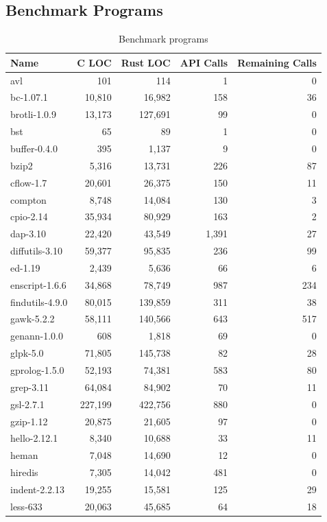 \subsection{Benchmark Programs}
\label{sec:evaluation:benchmark}

\renewcommand{\arraystretch}{0.45}
\begin{table}[t]
  \caption{Benchmark programs}
  \label{tab:benchmark}
  \centering
\scriptsize
  \vspace{-0.5em}
  \begin{tabular}{@{~}l@{~}||@{~}r@{~}|@{~}r@{~}|@{~}r@{~}|@{~}r@{~}}
    \textbf{Name} & \textbf{C LOC} & \textbf{Rust LOC} & \textbf{API Calls} & \textbf{Remaining Calls} \\
    \hline
avl&101&114&1&0\\
bc-1.07.1&10,810&16,982&158&36\\
brotli-1.0.9&13,173&127,691&99&0\\
bst&65&89&1&0\\
buffer-0.4.0&395&1,137&9&0\\
bzip2&5,316&13,731&226&87\\
cflow-1.7&20,601&26,375&150&11\\
compton&8,748&14,084&130&3\\
cpio-2.14&35,934&80,929&163&2\\
dap-3.10&22,420&43,549&1,391&27\\
diffutils-3.10&59,377&95,835&236&99\\
ed-1.19&2,439&5,636&66&6\\
enscript-1.6.6&34,868&78,749&987&234\\
findutils-4.9.0&80,015&139,859&311&38\\
gawk-5.2.2&58,111&140,566&643&517\\
genann-1.0.0&608&1,818&69&0\\
glpk-5.0&71,805&145,738&82&28\\
gprolog-1.5.0&52,193&74,381&583&80\\
grep-3.11&64,084&84,902&70&11\\
gsl-2.7.1&227,199&422,756&880&0\\
gzip-1.12&20,875&21,605&97&0\\
hello-2.12.1&8,340&10,688&33&11\\
heman&7,048&14,690&12&0\\
hiredis&7,305&14,042&481&0\\
indent-2.2.13&19,255&15,581&125&29\\
less-633&20,063&45,685&64&18\\

\end{tabular}
\end{table}
